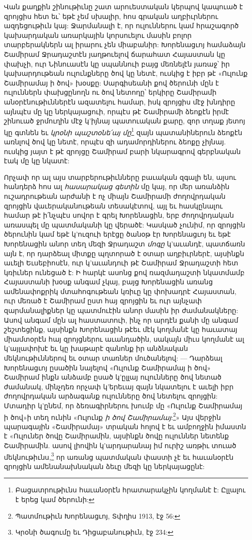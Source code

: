 \documentclass{article}
\begin{document}
{Վան քաղքին շինութիւնը շատ արուեստական կերպով կապուած է զրոյցիս հետ եւ՝ եթէ չեմ սխալիր, հոս գրական աղբիւրներու ազդեցութիւն կայ: Ջարմանալի է, որ ուլուններու կամ հրաշագործ կախարդական առարկային կորսուելու մասին բոլոր տարբերակներն ալ իրարու չեն միաբանիր: Խորենացւոյ համաձայն Շամիրամ Ջրադաշտէն յաղթուելով ճարահատ Հայաստան կը փախչի, ուր Նինուասէն կը սպաննուի բայց մեռնելէն յառաջ՝ իր կախարդութեան ուլունքները ծով կը նետէ, ուսկից է իբր թէ «Ուլունք Շամիրամայ ի ծով» խօսքը: Սարգիսեանի քով ծերունի մըն է ուլուններն փախցընողն ու ծով նետողը՝ երկիրը Շամիրամի անօրէնութիւններէն ազատելու համար, իսկ զրոյցիս մէջ խնդիրը այնպէս մը կը ներկայացուի, որպէս թէ Շամիրամի ձեոքէն իրմէ շինուած ջրմուղին մէջ կ'իյնայ պատուական քարը, զոր տղաք յետոյ կը գտնեն եւ \emph{կրօնի պաշտօնե՛այ մը}\footnote{Բացատրութիւնս հաւանօրէն հրատարակչին կողմանէ է: Ըլլալու է երեց կամ ծերունի:} զայն պատանիներուն ձեոքէն առնլով ծով կը նետէ, որպէս զի ադամորդիներու ձեոքը չիյնայ. ուսկից յայտ է թէ զրոյցը Շամիրամ բարի նկարագրով գերբնական էակ մը կը նկատէ:

Որչափ որ ալ այս տարբերութիւնները բաւական զգալի են, այսու հանդերձ հոս ալ \emph{հասարակաց գետին} մը կայ, որ մեր առանձին ուշադրութեան արժանի է ոչ միայն Շամիրամի ժողովրդական զրոյցին վաւերականութեան տեսակէտով, այլ եւ հասկընալու համար թէ ի՛նչպէս սովոր է գրել Խորենացին, երբ ժողովրդական առասպել մը պատմականի կը վերածէ: Կասկած չունիմ, որ զրոյցին ծերունին կամ եթէ կ'ուզուի երէցը ծանօթ էր Խորենացւոյ եւ եթէ Խորենացին անոր տեղ մեզի Ջրադաշտ \emph{մոգը} կ'աւանդէ, պատճառն այն է, որ դարձեալ միտքը պղտորած է օտար աղբիւրներէ, այսինքն աւելի Եւսեբիոսէն, ուր կ'աւանդուի թէ Շամիրամ Ջրադաշտի հետ կռիւներ ունեցած է: Ի հարկէ ասոնց քով ռազմադաշտի նկատմամբ Հայաստանի խօսք անգամ չկայ, բայց Խորենացին առանց ամենափոքրիկ մտահոգութեան կռիւը կը փոխադրէ Հայաստան, ուր մեռած է Շամիրամ ըստ հայ զրոյցին եւ ուր այնչափ զարմանալիքներ կը պատմուէին անոր մասին իր ժամանակները: Ասով անգամ մըն ալ հաստատուի, ինչ որ արդէն քանի մը անգամ շեշտեցինք, այսինքն Խորենացին թէեւ մէկ կողմանէ կը հաւատայ միամտօրէն հայ զրոյցներու աւանդածին, սակայն միւս կողմանէ ալ կ'այլափոխէ եւ կը խաթարէ զանոնք իր անձնական մեկնութիւններով եւ օտար տառներ մուծանելով: — Դարձեալ Խորենացւոյ ըսածին նայելով «Ուլունք Շամիրամայ ի ծով» Շամիրամ ինքն անձամբ ըսած կ'ըլլայ ուլունները ծով նետած ժամանակ, մինչդեռ որչափ կ'երեւայ զայն նկատելու է աւելի իբր ժողովրդական արձագանք ուլունները ծով նետելու զրոյցին: Մտադիր կ'ընեմ, որ ձեռագիրներու խումբ մը «Ուլունք Շամիրամայ ի ծով»ի տեղ ունին «Ուլունք \emph{ի ծով Շամիրամայ}:\footnote{Պատմութիւն Խորենացւոյ, Տփղիս 1913, էջ 56:}» Այս վերջին պարագային «Շամիրամայ» տրական հոլով է եւ ամբողջին իմաստն է «Ուլուներ ծովը Շամիրամին, այսինքն ծովը ուլուններ նետենք Շամիրամին. ասով լիովին կ'արդարանայ իմ ուրիշ առթիւ տուած մեկնութիւնս,\footnote{Կրօնի ծագումը եւ Դիցաբանութիւն, էջ 234:} որ առանց պատմական փաստի չէ եւ հաւանօրէն զրոյցին ամենանախնական ձեւը մեզի կը ներկայացընէ:

}
\end{document}
